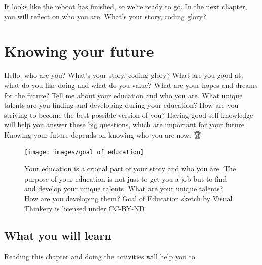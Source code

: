 \documentclass[
]{book}
\begin{document}
It looks like the reboot has finished, so we're ready to go. In the next chapter, you will reflect on who you are. What's your story, coding glory?

\hypertarget{knowing}{%
\chapter{Knowing your future}\label{knowing}}

Hello, who are you? What's your story, coding glory? What are you good at, what do you like doing and what do you value? What are your hopes and dreams for the future? Tell me about your education and who you are. What unique talents are you finding and developing during your education? How are you striving to become the best possible version of you? Having good self knowledge will help you answer these big questions, which are important for your future. Knowing your future depends on knowing who you are now. 🏆

\begin{figure}

{\centering \texttt{[image: images/goal of education]} 

}

\caption{Your education is a crucial part of your story and who you are. The purpose of your education is not just to get you a job but to find and develop your unique talents. What are your unique talents? How are you developing them? \href{https://www.flickr.com/photos/122135325@N06/16627558943/}{Goal of Education} sketch by \href{https://visualthinkery.com/}{Visual Thinkery} is licensed under \href{https://creativecommons.org/licenses/by-nd/4.0/}{CC-BY-ND}}\label{fig:goal-fig}
\end{figure}



\hypertarget{ilo2}{%
\section{What you will learn}\label{ilo2}}

Reading this chapter and doing the activities will help you to
\end{document}
